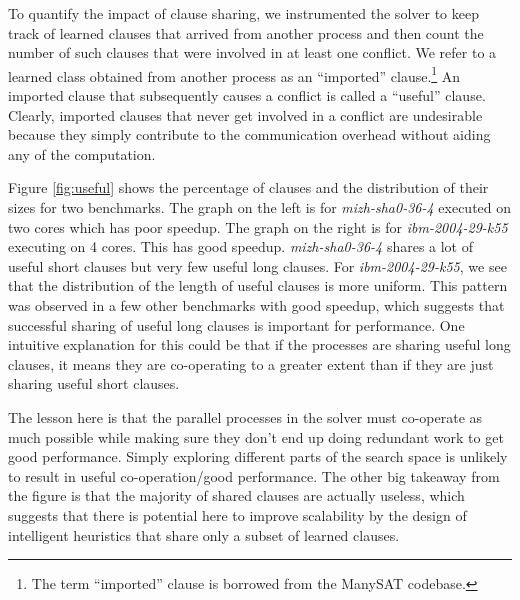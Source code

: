 \documentclass[letterpaper, compsoc, conference]{IEEEtran}
\begin{document}
To quantify the impact of clause sharing, we instrumented the solver to keep
track of learned clauses that arrived from another process and then count the
number of such clauses that were involved in at least one conflict.  We refer
to a learned class obtained from another process as an ``imported''
clause.\footnote{The term ``imported'' clause is borrowed from the ManySAT
codebase.} An imported clause that subsequently causes a conflict is called a
``useful'' clause. Clearly, imported clauses that never get involved in a
conflict are undesirable because they simply contribute to the communication
overhead without aiding any of the computation.

Figure \ref{fig:useful} shows the percentage of clauses and the distribution of
their sizes for two benchmarks. The graph on the left is for
\textit{mizh-sha0-36-4} executed on two cores which has poor speedup. The graph
on the right is for \textit{ibm-2004-29-k55} executing on 4 cores. This has
good speedup. \textit{mizh-sha0-36-4} shares a lot of useful short clauses but
very few useful long clauses. For \textit{ibm-2004-29-k55}, we see that the
distribution of the length of useful clauses is more uniform. This pattern was
observed in a few other benchmarks with good speedup, which suggests that
successful sharing of useful long clauses is important for performance. One
intuitive explanation for this could be that if the processes are sharing
useful long clauses, it means they are co-operating to a greater extent than if
they are just sharing useful short clauses. 

{The lesson here is that the parallel processes in the solver must co-operate
as much possible while making sure they don't end up doing redundant work to
get good performance.} Simply exploring different parts of the search space is
unlikely to result in useful co-operation/good performance. The other big
takeaway from the figure is that the majority of shared clauses are actually
useless, which suggests that there is potential here to improve scalability by
the design of intelligent heuristics that share only a subset of learned
clauses.
\end{document}
